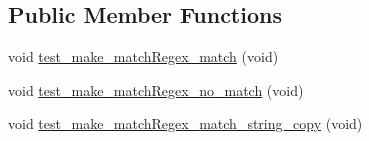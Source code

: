 \subsection*{Public Member Functions}
\begin{DoxyCompactItemize}
\item 
void \hyperlink{classRegexTestSuite_aac0838d917fd9fd6cc71ee086c644555}{test\-\_\-make\-\_\-match\-Regex\-\_\-match} (void)
\item 
void \hyperlink{classRegexTestSuite_ad9c02b9f4fd7feca750d476cda8e0c60}{test\-\_\-make\-\_\-match\-Regex\-\_\-no\-\_\-match} (void)
\item 
void \hyperlink{classRegexTestSuite_a0f46b90e2c0a1c98750a3335d086979a}{test\-\_\-make\-\_\-match\-Regex\-\_\-match\-\_\-string\-\_\-copy} (void)
\end{DoxyCompactItemize}


